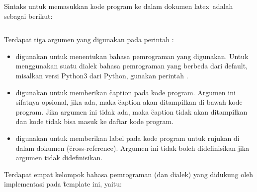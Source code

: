 

Sintaks untuk memasukkan kode program ke dalam dokumen \gls{latex}~adalah sebagai berikut:

\begin{lstlisting}[language={[latex]tex}, caption=Meng]

\end{lstlisting}

Terdapat tiga argumen yang digunakan pada perintah :
\begin{itemize}
	\item {} digunakan untuk menentukan bahasa pemrograman yang digunakan.
	Untuk menggunakan suatu dialek bahasa pemrograman yang berbeda dari \f{default},
	misalkan versi Python3 dari Python,
	gunakan perintah .
	\item {} digunakan untuk memberikan \f{caption} pada kode program.
	Argumen ini sifatnya opsional, jika ada, maka \f{caption} akan ditampilkan di bawah kode program.
	Jika argumen ini tidak ada, maka \f{caption} tidak akan ditampilkan dan kode tidak bisa masuk ke daftar kode program.
	\item {} digunakan untuk memberikan label pada kode program untuk rujukan di dalam dokumen (\f{cross-reference}).
	Argumen ini tidak boleh didefinisikan jika argumen  tidak didefinisikan.
\end{itemize}

Terdapat empat kelompok bahasa pemrograman (dan dialek) yang didukung oleh implementasi  pada \f{template} ini, yaitu:

